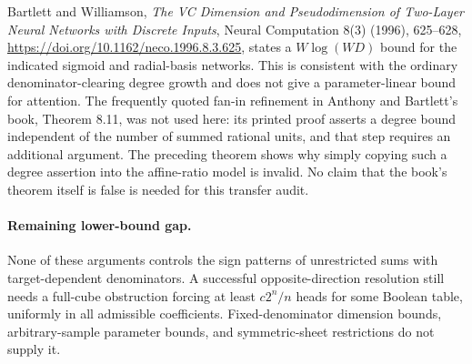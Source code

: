 \documentclass[11pt]{article}
\begin{document}
Bartlett and Williamson, \emph{The VC Dimension and Pseudodimension
of Two-Layer Neural Networks with Discrete Inputs}, Neural Computation
8(3) (1996), 625--628,
\url{https://doi.org/10.1162/neco.1996.8.3.625}, states a
$W\log(WD)$ bound for the indicated sigmoid and radial-basis networks.
This is consistent with the ordinary denominator-clearing degree
growth and does not give a parameter-linear bound for attention.
The frequently quoted fan-in refinement in Anthony and Bartlett's
book, Theorem 8.11, was not used here: its printed proof asserts a
degree bound independent of the number of summed rational units,
and that step requires an additional argument. The preceding theorem
shows why simply copying such a degree assertion into the affine-ratio
model is invalid. No claim that the book's theorem itself is false
is needed for this transfer audit.

\paragraph{Remaining lower-bound gap.}
None of these arguments controls the sign patterns of unrestricted
sums with target-dependent denominators. A successful opposite-direction
resolution still needs a full-cube obstruction forcing at least
$c2^n/n$ heads for some Boolean table, uniformly in all admissible
coefficients. Fixed-denominator dimension bounds, arbitrary-sample
parameter bounds, and symmetric-sheet restrictions do not supply it.
\end{document}
